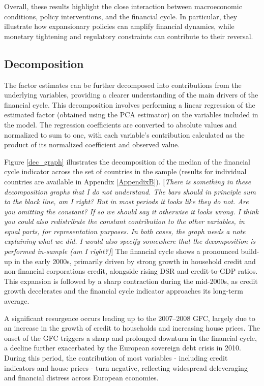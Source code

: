 Overall, these results highlight the close interaction between macroeconomic conditions, policy interventions, and the financial cycle. In particular, they illustrate how expansionary policies can amplify financial dynamics, while monetary tightening and regulatory constraints can contribute to their reversal.

\subsection{Decomposition}

The factor estimates can be further decomposed into contributions from the underlying variables, providing a clearer understanding of the main drivers of the financial cycle. This decomposition involves performing a linear regression of the estimated factor (obtained using the PCA estimator) on the variables included in the model. The regression coefficients are converted to absolute values and normalized to sum to one, with each variable's contribution calculated as the product of its normalized coefficient and observed value.

Figure \ref{dec_graph} illustrates the decomposition of the median of the financial cycle indicator across the set of countries in the sample (results for individual countries are available in Appendix \ref{AppendixB}). {\color{blue}[\textit{There is something in these decomposition graphs that I do not understand. The bars should in principle sum to the black line, am I right? But in most periods it looks like they do not. Are you omitting the constant? If so we should say it otherwise it looks wrong. I think you could also redistribute the constant contribution to the other variables, in equal parts, for representation purposes. In both cases, the graph needs a note explaining what we did. I would also specify somewhere that the decomposition is performed in-sample (am I right?)}]} The financial cycle shows a pronounced build-up in the early 2000s, primarily driven by strong growth in household credit and non-financial corporations credit, alongside rising DSR and credit-to-GDP ratios. This expansion is followed by a sharp contraction during the mid-2000s, as credit growth decelerates and the financial cycle indicator approaches its long-term average.

A significant resurgence occurs leading up to the 2007–2008 GFC, largely due to an increase in the growth of credit to households and increasing house prices. The onset of the GFC triggers a sharp and prolonged downturn in the financial cycle, a decline further exacerbated by the European sovereign debt crisis in 2010. During this period, the contribution of most variables - including credit indicators and house prices - turn negative, reflecting widespread deleveraging and financial distress across European economies.

